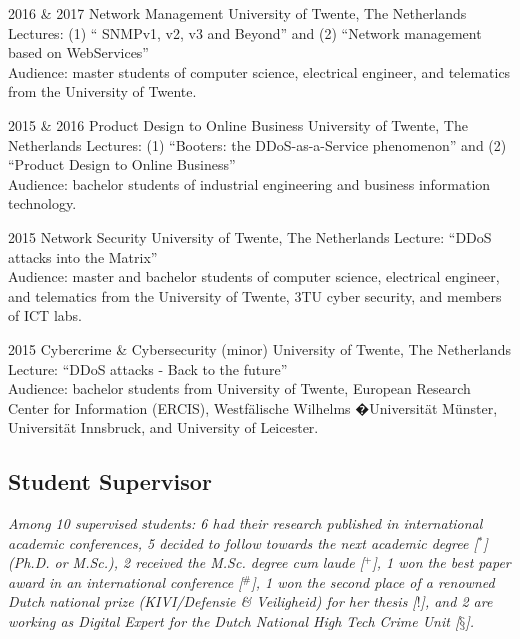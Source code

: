 \documentclass[print]{styles/friggeri-cv-mac} %
\begin{document}
\begin{entrylist}
\entry
{2016 \& 2017}
{Network Management}
{University of Twente, The Netherlands}
{Lectures: (1) `` SNMPv1, v2, v3 and Beyond'' and (2) ``Network management based
	on WebServices''\\
Audience: master students of computer science, electrical engineer, and
telematics from the University of Twente. }

\entry
{2015 \& 2016}
{Product Design to Online Business}
{University of Twente, The Netherlands}
{Lectures: (1) ``Booters: the DDoS-as-a-Service phenomenon'' and (2) ``Product
Design to Online Business''\\ Audience: bachelor students of industrial
engineering and business information technology.}

\entry
{2015}
{Network Security}
{University of Twente, The Netherlands}
{Lecture: ``DDoS attacks into the Matrix''\\
Audience: master and bachelor students of computer science, electrical engineer,
and telematics from the University of Twente, 3TU cyber security, and members of ICT labs. }

\entry
{2015}
{Cybercrime \& Cybersecurity (minor)}
{University of Twente, The Netherlands}
{Lecture: ``DDoS attacks - Back to the future''\\ 
Audience: bachelor students from University of Twente, European Research Center
for Information (ERCIS), Westf\"alische Wilhelms �Universit\"at M\"unster, Universit\"at Innsbruck, and University of Leicester. } \end{entrylist}

\subsection{Student Supervisor}\vspace{-5pt}

\textit{Among 10 supervised students: 6 had their research published in
international academic conferences, 5 decided to follow towards the next
academic degree [$^*$] (Ph.D. or M.Sc.), 2 received the M.Sc. degree
\textit{cum laude} [$^+$], 1 won the best paper award in an international
conference [$^\#$], 1 won the second place of a renowned Dutch national
prize (KIVI/Defensie \& Veiligheid) for her thesis [$!$], and 2 are working as Digital Expert for the Dutch National High Tech Crime Unit [$§$].}
\end{document}
